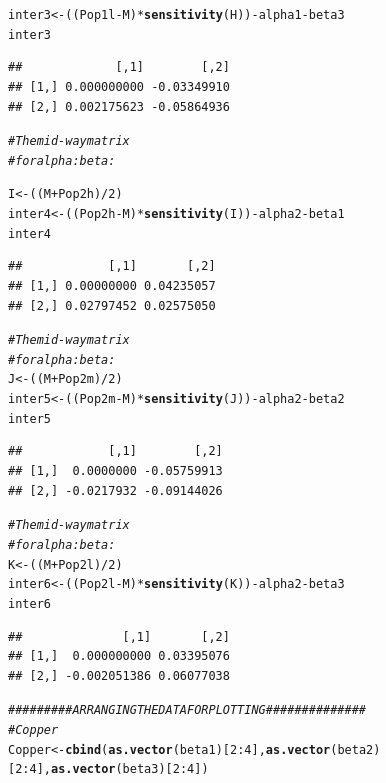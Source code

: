 \documentclass{article}\usepackage[]{graphicx}\usepackage[]{color}
\makeatletter
\newcommand{\hlnum}[1]{\textcolor[rgb]{0.686,0.059,0.569}{#1}}%
\newcommand{\hlcom}[1]{\textcolor[rgb]{0.678,0.584,0.686}{\textit{#1}}}%
\newcommand{\hlopt}[1]{\textcolor[rgb]{0,0,0}{#1}}%
\newcommand{\hlstd}[1]{\textcolor[rgb]{0.345,0.345,0.345}{#1}}%
\newcommand{\hlkwb}[1]{\textcolor[rgb]{0.69,0.353,0.396}{#1}}%
\newcommand{\hlkwd}[1]{\textcolor[rgb]{0.737,0.353,0.396}{\textbf{#1}}}%
\newenvironment{kframe}{%
 \def\at@end@of@kframe{}%
 \ifinner\ifhmode%
  \def\at@end@of@kframe{\end{minipage}}%
  \begin{minipage}{\columnwidth}%
 \fi\fi%
 \def\FrameCommand##1{\hskip\@totalleftmargin \hskip-\fboxsep
 \colorbox{shadecolor}{##1}\hskip-\fboxsep
     \hskip-\linewidth \hskip-\@totalleftmargin \hskip\columnwidth}%
 \MakeFramed {\advance\hsize-\width
   \@totalleftmargin\z@ \linewidth\hsize
   \@setminipage}}%
 {\par\unskip\endMakeFramed%
 \at@end@of@kframe}
\newenvironment{knitrout}{}{} %
\makeatother
\begin{document}
\begin{knitrout}
\begin{kframe}
\begin{alltt}
\hlstd{inter3}\hlkwb{<-}\hlstd{((Pop1l}\hlopt{-}\hlstd{M)}\hlopt{*}\hlkwd{sensitivity}\hlstd{(H))}\hlopt{-}\hlstd{alpha1}\hlopt{-}\hlstd{beta3}
\hlstd{inter3}
\end{alltt}
\begin{verbatim}
##             [,1]        [,2]
## [1,] 0.000000000 -0.03349910
## [2,] 0.002175623 -0.05864936
\end{verbatim}
\begin{alltt}
\hlcom{#The mid-way matrix }
\hlcom{#for alpha:beta:}

\hlstd{I}\hlkwb{<-}\hlstd{((M}\hlopt{+}\hlstd{Pop2h)}\hlopt{/}\hlnum{2}\hlstd{)}
\hlstd{inter4}\hlkwb{<-}\hlstd{((Pop2h}\hlopt{-}\hlstd{M)}\hlopt{*}\hlkwd{sensitivity}\hlstd{(I))}\hlopt{-}\hlstd{alpha2}\hlopt{-}\hlstd{beta1}
\hlstd{inter4}
\end{alltt}
\begin{verbatim}
##            [,1]       [,2]
## [1,] 0.00000000 0.04235057
## [2,] 0.02797452 0.02575050
\end{verbatim}
\begin{alltt}
\hlcom{#The mid-way matrix }
\hlcom{#for alpha:beta:}
\hlstd{J}\hlkwb{<-}\hlstd{((M}\hlopt{+}\hlstd{Pop2m)}\hlopt{/}\hlnum{2}\hlstd{)}
\hlstd{inter5}\hlkwb{<-}\hlstd{((Pop2m}\hlopt{-}\hlstd{M)}\hlopt{*}\hlkwd{sensitivity}\hlstd{(J))}\hlopt{-}\hlstd{alpha2}\hlopt{-}\hlstd{beta2}
\hlstd{inter5}
\end{alltt}
\begin{verbatim}
##            [,1]        [,2]
## [1,]  0.0000000 -0.05759913
## [2,] -0.0217932 -0.09144026
\end{verbatim}
\begin{alltt}
\hlcom{#The mid-way matrix }
\hlcom{#for alpha:beta:}
\hlstd{K}\hlkwb{<-}\hlstd{((M}\hlopt{+}\hlstd{Pop2l)}\hlopt{/}\hlnum{2}\hlstd{)}
\hlstd{inter6}\hlkwb{<-}\hlstd{((Pop2l}\hlopt{-}\hlstd{M)}\hlopt{*}\hlkwd{sensitivity}\hlstd{(K))}\hlopt{-}\hlstd{alpha2}\hlopt{-}\hlstd{beta3}
\hlstd{inter6}
\end{alltt}
\begin{verbatim}
##              [,1]       [,2]
## [1,]  0.000000000 0.03395076
## [2,] -0.002051386 0.06077038
\end{verbatim}
\begin{alltt}
\hlcom{######### ARRANGING THE DATA FOR PLOTTING ##############}
\hlcom{#Copper}
\hlstd{Copper} \hlkwb{<-} \hlkwd{cbind}\hlstd{(}\hlkwd{as.vector}\hlstd{(beta1)[}\hlnum{2}\hlopt{:}\hlnum{4}\hlstd{],} \hlkwd{as.vector}\hlstd{(beta2)[}\hlnum{2}\hlopt{:}\hlnum{4}\hlstd{],} \hlkwd{as.vector}\hlstd{(beta3)[}\hlnum{2}\hlopt{:}\hlnum{4}\hlstd{])}

\end{alltt}
\end{kframe}
\end{knitrout}
\end{document}
